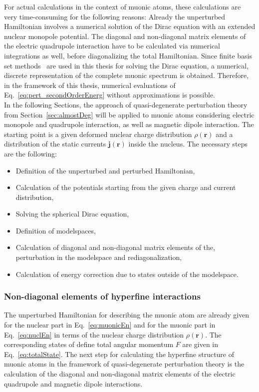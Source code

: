 For actual calculations in the context of muonic atoms, these calculations are very time-consuming for the following reasons: Already the unperturbed Hamiltonian involves a numerical solution of the Dirac equation with an extended nuclear monopole potential. The diagonal and non-diagonal matrix elements of the electric quadrupole interaction have to be calculated via numerical integrations as well, before diagonalizing the total Hamiltonian. Since finite basis set methods~\cite{Shabaev2004} are used in this thesis for solving the Dirac equation, a numerical, discrete representation of the complete muonic spectrum is obtained. Therefore, in the framework of this thesis, numerical evaluations of Eq.~\eqref{eq:pert_secondOrderEnerg} without approximations is possible.\\

In the following Sections, the approach of quasi-degenerate perturbation theory from Section~\ref{sec:almostDeg} will be applied to muonic atoms considering electric monopole and quadrupole interaction, as well as magnetic dipole interaction. The starting point is a given deformed nuclear charge distribution $\rho(\mathbf{r})$ and a distribution of the static currents $\mathbf{j}(\mathbf{r})$ inside the nucleus.
The necessary steps are the following:
\begin{itemize}
\item Definition of the unperturbed  and perturbed Hamiltonian,
\item Calculation of the potentials starting from the given charge and current distribution,
\item Solving the spherical Dirac equation,
\item Definition of modelspaces,
\item Calculation of diagonal and non-diagonal matrix elements of the, perturbation in the modelspace and rediagonalization,
\item Calculation of energy correction due to states outside of the modelspace.
\end{itemize}


\subsubsection{Non-diagonal elements of hyperfine interactions}
\label{sec:non-diagElements}
The unperturbed Hamiltonian for describing the muonic atom are already given for the nuclear part in Eq.~\eqref{eq:muonicEn} and for the muonic part in Eq.~\eqref{eq:nuclEn} in terms of the nuclear charge distribution $\rho(\mathbf{r})$. The corresponding states of define total angular momentum $F$ are given in Eq.~\eqref{eq:totalState}.
The next step for calculating the hyperfine structure of muonic atoms in the framework of quasi-degenerate perturbation theory is the calculation of the diagonal and non-diagonal matrix elements of the electric quadrupole and magnetic dipole interactions.


